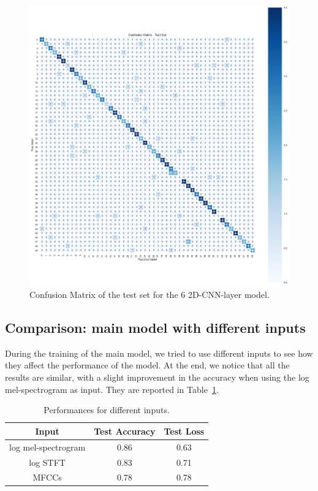 \documentclass{article}
\begin{document}
\begin{sloppy}
\begin{figure}[ht]
  \centering
  \centerline{\includegraphics[width=\columnwidth]{6_2D_CNN_layer_model_confusion_matrix_test.png}}
  \caption{Confusion Matrix of the test set for the 6 2D-CNN-layer model.}
  \label{fig:6_2D_CNN_layer_model_confusion_matrix_test}
\end{figure}


\subsection{Comparison: main model with different inputs}
\label{sec:comparison_1}
During the training of the main model, we tried to use different inputs to see how they affect the performance of the model.
At the end, we notice that all the results are similar, with a slight improvement in the accuracy when using the log mel-spectrogram as input.
They are reported in Table~\ref{tab:comparison_inputs}.
\begin{table}[ht]
  \centering
  \caption{Performances for different inputs.}
  \label{tab:comparison_inputs}
  \begin{tabular}{|c|c|c|}
    \hline
    Input & Test Accuracy & Test Loss \\
    \hline
    log mel-spectrogram & 0.86 & 0.63 \\
    log STFT & 0.83 & 0.71 \\
    MFCCs & 0.78 & 0.78 \\
    \hline
  \end{tabular}
\end{table}


\end{sloppy}
\end{document}
